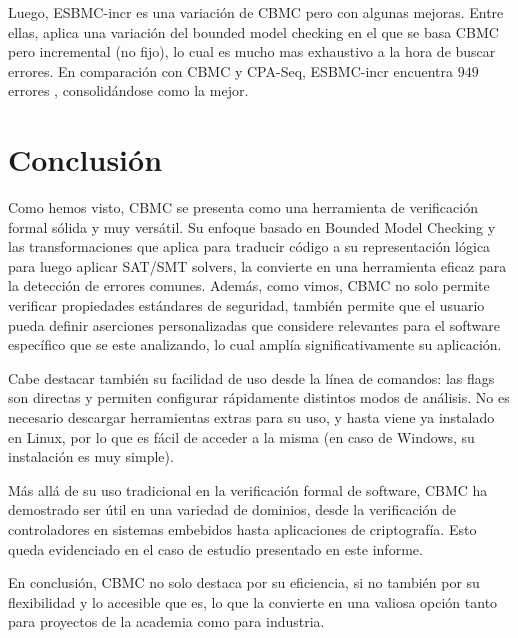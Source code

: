 \documentclass[runningheads]{llncs}
\begin{document}
Luego, ESBMC-incr es una variación de CBMC pero con algunas mejoras.
Entre ellas, aplica una variación del bounded model checking en el que se basa CBMC pero incremental (no fijo), lo cual es mucho mas exhaustivo a la hora de buscar errores.
En comparación con CBMC y CPA-Seq, ESBMC-incr encuentra $949$ errores \cite{cbmc-comparison}, consolidándose como la mejor.

\section{Conclusión}
Como hemos visto, CBMC se presenta como una herramienta de verificación formal sólida y muy versátil.
Su enfoque basado en Bounded Model Checking y las transformaciones que aplica para traducir código a su representación lógica para luego aplicar SAT/SMT solvers, la convierte en una herramienta eficaz para la detección de errores comunes.
Además, como vimos, CBMC no solo permite verificar propiedades estándares de seguridad, también permite que el usuario pueda definir aserciones personalizadas que considere relevantes para el software específico que se este analizando, lo cual amplía significativamente su aplicación.

Cabe destacar también su facilidad de uso desde la línea de comandos: las flags son directas y permiten configurar rápidamente distintos modos de análisis.
No es necesario descargar herramientas extras para su uso, y hasta viene ya instalado en Linux, por lo que es fácil de acceder a la misma (en caso de Windows, su instalación es muy simple).

Más allá de su uso tradicional en la verificación formal de software, CBMC ha demostrado ser útil en una variedad de dominios, desde la verificación de controladores en sistemas embebidos hasta aplicaciones de criptografía.
Esto queda evidenciado en el caso de estudio presentado en este informe.

En conclusión, CBMC no solo destaca por su eficiencia, si no también por su flexibilidad y lo accesible que es, lo que la convierte en una valiosa opción tanto para proyectos de la academia como para industria.



\end{document}
